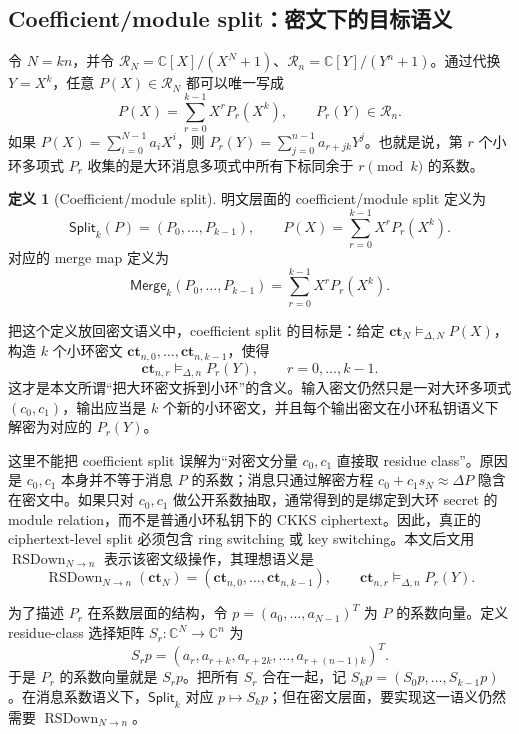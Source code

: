 \documentclass[UTF8,11pt]{article}
\newcommand{\Split}{\mathsf{Split}}
\newcommand{\Merge}{\mathsf{Merge}}
\newcommand{\ct}{\mathbf{ct}}
\theoremstyle{definition}
\newtheorem{definition}{定义}
\theoremstyle{plain}
\begin{document}
\subsection{Coefficient/module split：密文下的目标语义}
\label{subsec:coefficient-module-split}

令 \(N=kn\)，并令 \(\mathcal R_N=\mathbb C[X]/(X^N+1)\)、\(\mathcal R_n=\mathbb C[Y]/(Y^n+1)\)。通过代换 \(Y=X^k\)，任意 \(P(X)\in\mathcal R_N\) 都可以唯一写成
\[
P(X)=\sum_{r=0}^{k-1}X^rP_r(X^k),\qquad P_r(Y)\in\mathcal R_n.
\]
如果 \(P(X)=\sum_{i=0}^{N-1}a_iX^i\)，则 \(P_r(Y)=\sum_{j=0}^{n-1}a_{r+jk}Y^j\)。也就是说，第 \(r\) 个小环多项式 \(P_r\) 收集的是大环消息多项式中所有下标同余于 \(r\pmod k\) 的系数。

\begin{definition}[Coefficient/module split]
明文层面的 coefficient/module split 定义为
\[
\Split_k(P)=(P_0,\ldots,P_{k-1}),
\qquad
P(X)=\sum_{r=0}^{k-1}X^rP_r(X^k).
\]
对应的 merge map 定义为
\[
\Merge_k(P_0,\ldots,P_{k-1})
=
\sum_{r=0}^{k-1}X^rP_r(X^k).
\]
\end{definition}

把这个定义放回密文语义中，coefficient split 的目标是：给定 \(\ct_N\vDash_{\Delta,N}P(X)\)，构造 \(k\) 个小环密文 \(\ct_{n,0},\ldots,\ct_{n,k-1}\)，使得
\[
\ct_{n,r}\vDash_{\Delta,n}P_r(Y),\qquad r=0,\ldots,k-1.
\]
这才是本文所谓“把大环密文拆到小环”的含义。输入密文仍然只是一对大环多项式 \((c_0,c_1)\)，输出应当是 \(k\) 个新的小环密文，并且每个输出密文在小环私钥语义下解密为对应的 \(P_r(Y)\)。

这里不能把 coefficient split 误解为“对密文分量 \(c_0,c_1\) 直接取 residue class”。原因是 \(c_0,c_1\) 本身并不等于消息 \(P\) 的系数；消息只通过解密方程 \(c_0+c_1s_N\approx \Delta P\) 隐含在密文中。如果只对 \(c_0,c_1\) 做公开系数抽取，通常得到的是绑定到大环 secret 的 module relation，而不是普通小环私钥下的 CKKS ciphertext。因此，真正的 ciphertext-level split 必须包含 ring switching 或 key switching。本文后文用 \(\operatorname{RSDown}_{N\to n}\) 表示该密文级操作，其理想语义是
\[
\operatorname{RSDown}_{N\to n}(\ct_N)
=
(\ct_{n,0},\ldots,\ct_{n,k-1}),
\qquad
\ct_{n,r}\vDash_{\Delta,n}P_r(Y).
\]

为了描述 \(P_r\) 在系数层面的结构，令 \(p=(a_0,\ldots,a_{N-1})^T\) 为 \(P\) 的系数向量。定义 residue-class 选择矩阵 \(S_r:\mathbb C^N\to\mathbb C^n\) 为
\[
S_rp=(a_r,a_{r+k},a_{r+2k},\ldots,a_{r+(n-1)k})^T.
\]
于是 \(P_r\) 的系数向量就是 \(S_rp\)。把所有 \(S_r\) 合在一起，记 \(S_kp=(S_0p,\ldots,S_{k-1}p)\)。在消息系数语义下，\(\Split_k\) 对应 \(p\mapsto S_kp\)；但在密文层面，要实现这一语义仍然需要 \(\operatorname{RSDown}_{N\to n}\)。
\end{document}
